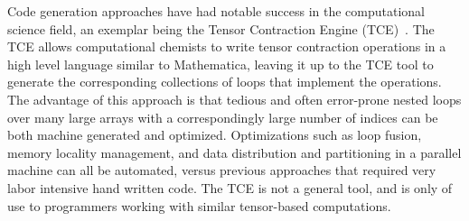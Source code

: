 Code generation approaches have had notable success in the
computational science field, an exemplar being the Tensor Contraction
Engine (TCE)~\cite{baumgartner05synthesis}. The TCE allows
computational chemists to write tensor contraction operations in a
high level language similar to Mathematica, leaving it up to the TCE
tool to generate the corresponding collections of loops that implement
the operations. The advantage of this approach is that tedious and
often error-prone nested loops over many large arrays with a
correspondingly large number of indices can be both machine generated
and optimized. Optimizations such as loop fusion, memory locality
management, and data distribution and partitioning in a parallel
machine can all be automated, versus previous approaches that required
very labor intensive hand written code. The TCE is not a general tool,
and is only of use to programmers working with similar tensor-based
computations.


% 
% 
% 
% 
